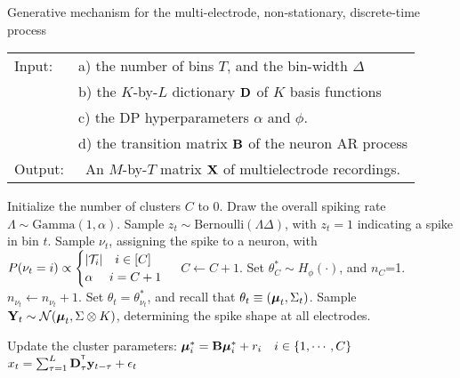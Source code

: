\begin{algorithm}
\caption{Generative mechanism for the multi-electrode, non-stationary, discrete-time process}\label{alg:gen_proc}
\begin{tabular}{p{1.2cm}p{12.4cm}}
Input:&  a) the number of bins $T$, and the bin-width $\Delta$\\
  &  b) the $K$-by-$L$ dictionary $\mathbf{D}$ of $K$ basis functions\\
  &  c) the DP hyperparameters $\alpha$ and $\phi$.\\ 
  &  d) the transition matrix $\mathbf{B}$ of the neuron AR process \\
Output:& \  An $M$-by-$T$ matrix $\mathbf{X}$ of multielectrode recordings. %
\end{tabular}
\begin{algorithmic}[1]
\State Initialize the number of clusters $C$ to $0$.
\State Draw the overall spiking rate $\Lambda \sim \text{Gamma}(1,\alpha)$.
\State Sample $z_t \sim \text{Bernoulli}(\Lambda \Delta)$, with $z_t = 1$ indicating a spike in bin $t$.
   \label{enum:thin}
  \State Sample $\nu_t$, assigning the spike to a neuron, with
$  P({\nu_t} = i) \propto 
  \begin{cases}
   |\mathcal{T}_i| \quad i \in [C] \\
   \alpha \quad\ i = C + 1 \\
  \end{cases}$
          \State  $C \leftarrow C + 1$. 
		\State Set $\theta^*_{C} \sim H_{\phi}(\cdot)$, and $n_C$=1.
       \Else \State  $n_{\nu_t} \leftarrow n_{\nu_t}+1$.
    \EndIf
\State Set $\theta_t = \theta^*_{\nu_t}$, and recall that $\theta_t \equiv (\boldsymbol{\mu}_t, \Sigma_t)$.
\State Sample $\bY_t %
           \sim \mathcal{N}(\mb{\mu}_t, \Sigma \otimes K)$, determining the spike shape at all electrodes. 
\EndIf

\State Update the cluster parameters: ${\boldsymbol{\mu}}^*_i = \mathbf{B} {\boldsymbol{\mu}}^*_i + r_i \quad i \in \{1, \cdots, C\}$
\State $x_t = \sum_{\tau = 1}^L \mathbf{D}_{\tau}^{^{\mathsf{T}}} \mathbf{y}_{t-\tau} + \epsilon_t$
\EndFor
\State {}
\end{algorithmic}
\end{algorithm}

